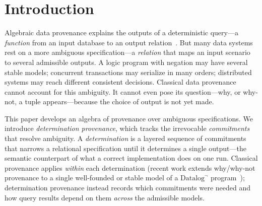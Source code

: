 \section{Introduction}
\label{sec:intro}

Algebraic data provenance explains the outputs of a deterministic query---a
\emph{function} from an input database to an output
relation~\cite{green2007provenance,suciu2011probabilistic}. But many data
systems rest on a more ambiguous specification---a \emph{relation} that maps
an input scenario to several admissible outputs. A logic program with negation
may have several stable models; concurrent transactions may serialize in many
orders; distributed systems may reach different consistent decisions.
Classical data provenance cannot account for this ambiguity. It cannot even
pose its question---why, or why-not, a tuple appears---because the choice of
output is not yet made.

This paper develops an algebra of provenance over ambiguous specifications. We
introduce \emph{determination provenance}, which tracks the irrevocable
\emph{commitments} that resolve ambiguity. A \emph{determination} is a layered
sequence of commitments that narrows a relational specification until it
determines a single output---the semantic counterpart of what a correct
implementation does on one run. Classical provenance applies \emph{within}
each determination (recent work extends why/why-not provenance to a single
well-founded or stable model of a $\mbox{Datalog}^\neg$
program~\cite{bogaerts2026whynot}); determination provenance instead records
which commitments were needed and how query results depend on them \emph{across}
the admissible models.

